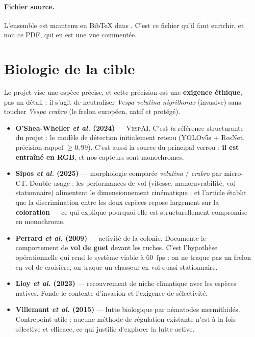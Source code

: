 \documentclass[11pt,a4paper]{article}
\begin{document}
\paragraph{Fichier source.} L'ensemble est maintenu en BibTeX dans
\textbf{}. C'est ce fichier qu'il faut enrichir, et non ce PDF,
qui en est une vue commentée.

\section{Biologie de la cible}

Le projet vise une espèce précise, et cette précision est une \textbf{exigence éthique}, pas
un détail : il s'agit de neutraliser \emph{Vespa velutina nigrithorax} (invasive) sans
toucher \emph{Vespa crabro} (le frelon européen, natif et protégé).

\begin{itemize}[leftmargin=*]
  \item \textbf{O'Shea-Wheller \emph{et al.} (2024)} \cite{osheawheller2024vespai} —
        \textsc{VespAI}. C'est \emph{la} référence structurante du projet : le modèle de
        détection initialement retenu (YOLOv5s + ResNet, précision-rappel $\geq 0{,}99$).
        C'est aussi la source du principal verrou : \textbf{il est entraîné en RGB}, et nos
        capteurs sont monochromes.

  \item \textbf{Sipos \emph{et al.} (2025)} \cite{sipos2025morphologie} — morphologie
        comparée \emph{velutina} / \emph{crabro} par micro-CT. Double usage : les
        performances de vol (vitesse, manœuvrabilité, vol stationnaire) alimentent le
        dimensionnement cinématique ; et l'article établit que la discrimination entre les
        deux espèces repose largement sur la \textbf{coloration} — ce qui explique pourquoi
        elle est structurellement compromise en monochrome.

  \item \textbf{Perrard \emph{et al.} (2009)} \cite{perrard2009colonie} — activité de la
        colonie. Documente le comportement de \textbf{vol de guet} devant les ruches.
        C'est l'hypothèse opérationnelle qui rend le système viable à 60~fps : on ne traque
        pas un frelon en vol de croisière, on traque un chasseur en vol quasi stationnaire.

  \item \textbf{Lioy \emph{et al.} (2023)} \cite{lioy2023niche} — recouvrement de niche
        climatique avec les espèces natives. Fonde le contexte d'invasion et l'exigence de
        sélectivité.

  \item \textbf{Villemant \emph{et al.} (2015)} \cite{villemant2015parasites} — lutte
        biologique par nématodes mermithidés. Contrepoint utile : aucune méthode de
        régulation existante n'est à la fois sélective et efficace, ce qui justifie
        d'explorer la lutte active.
\end{itemize}
\end{document}
